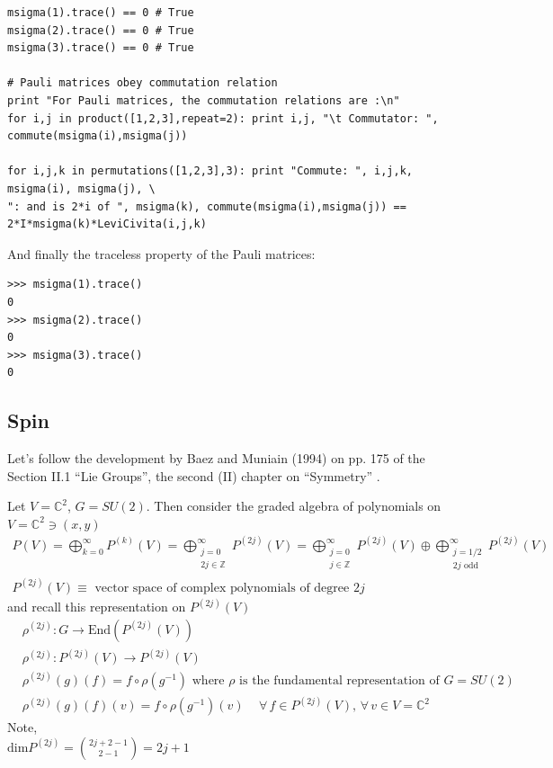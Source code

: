 \documentclass[10pt]{amsart}
\begin{document}
\begin{multicols*}{2}
\begin{lstlisting}
msigma(1).trace() == 0 # True
msigma(2).trace() == 0 # True
msigma(3).trace() == 0 # True

# Pauli matrices obey commutation relation
print "For Pauli matrices, the commutation relations are :\n"
for i,j in product([1,2,3],repeat=2): print i,j, "\t Commutator: ", commute(msigma(i),msigma(j))

for i,j,k in permutations([1,2,3],3): print "Commute: ", i,j,k, msigma(i), msigma(j), \ 
": and is 2*i of ", msigma(k), commute(msigma(i),msigma(j)) == 2*I*msigma(k)*LeviCivita(i,j,k)

\end{lstlisting}

And finally the traceless property of the Pauli matrices:
\begin{lstlisting}
>>> msigma(1).trace()
0
>>> msigma(2).trace()
0
>>> msigma(3).trace()
0
\end{lstlisting} 

\subsection{Spin}

Let's follow the development by Baez and Muniain (1994) on pp. 175 of the Section II.1 ``Lie Groups'', the second (II) chapter on ``Symmetry'' \cite{JBaezJMuniain1994}.  

Let $V = \mathbb{C}^2$, $G=SU(2)$.  Then consider the graded algebra of polynomials on $V = \mathbb{C}^2 \ni (x,y)$
\[
\begin{gathered}
P(V) = \bigoplus_{k=0}^{\infty} P^{(k)}(V) = \bigoplus_{ \substack{ j =0 \\ 2j \in \mathbb{Z}} }^{\infty} P^{(2j)}(V) = \bigoplus_{ \substack{ j=0 \\ j\in \mathbb{Z} }}^{\infty} P^{(2j)}(V) \oplus \bigoplus_{ \substack{ j=1/2 \\ 2j \text{ odd } } }^{\infty} P^{(2j)}(V) \\
P^{(2j)}(V) \equiv \text{ vector space of complex polynomials of degree $2j$ }
\end{gathered}
\]
and recall this representation on $P^{(2j)}(V)$
\[
\begin{aligned}
& \rho^{(2j)}:G \to \text{End}(P^{(2j)}(V)) \\ 
& \rho^{(2j)}: P^{(2j)}(V) \to P^{(2j)}(V) \\ 
& \rho^{(2j)}(g)(f) = f\circ \rho(g^{-1}) \text{ where $\rho$ is the fundamental representation of $G=SU(2)$ }\\
& \rho^{(2j)}(g)(f)(v) = f\circ \rho(g^{-1})(v) \quad \, \forall \, f \in P^{(2j)}(V), \, \forall \, v \in V = \mathbb{C}^2
\end{aligned}
\]
Note, \\
$\text{dim}P^{(2j)} = \binom{2j+2-1 }{2-1} = 2j+1$


\end{multicols*}
\end{document}
